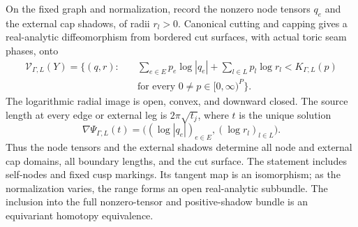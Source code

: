 \begin{theorem}
\label{A1-bordered-shadow-range}
On the fixed graph and normalization, record the nonzero node
tensors $q_e$ and the external cap shadows, of radii $r_l>0$.
Canonical cutting and capping gives a real-analytic diffeomorphism
from bordered cut surfaces, with actual toric seam phases, onto
\begin{align*}
 \mathcal V_{\Gamma,L}(Y)=\biggl\{(q,r):\quad&
 \sum_{e\in E}p_e\log|q_e|+
 \sum_{l\in L}p_l\log r_l<K_{\Gamma,L}(p)\\
 &\text{for every }0\ne p\in[0,\infty)^P\biggr\}.
\end{align*}
The logarithmic radial image is open, convex, and downward closed.
The source length at every edge or external leg is
$2\pi\sqrt{t_j}$, where $t$ is the unique solution
\[
 \nabla\Psi_{\Gamma,L}(t)
   =\bigl((\log|q_e|)_{e\in E},(\log r_l)_{l\in L}\bigr).
\]
Thus the node tensors and the external shadows determine all node
and external cap domains, all boundary lengths, and the cut surface.
The statement includes self-nodes and fixed cusp markings. Its
tangent map is an isomorphism; as the normalization varies, the
range forms an open real-analytic subbundle. The inclusion into
the full nonzero-tensor and positive-shadow bundle is an
equivariant homotopy equivalence.
\end{theorem}
